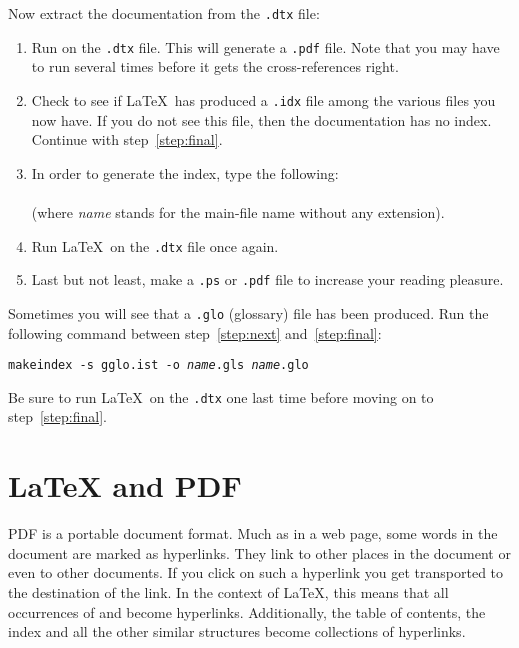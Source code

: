 \noindent Now extract the documentation from the
\texttt{.dtx} file:

\begin{enumerate}
\item Run  on the \texttt{.dtx} file.  This will generate a
  \texttt{.pdf} file. Note that you may have to run 
  several times before it gets the cross-references right.
\item Check to see if \LaTeX\ has produced a \texttt{.idx} file
  among the various files you now have.
  If you do not see this file, then the documentation has no index. Continue
  with step~\ref{step:final}.
\item In order to generate the index, type the following:\\
        \\
        (where \textit{name} stands for the main-file name without any
    extension).
 \item Run \LaTeX\ on the \texttt{.dtx} file once again. \label{step:next}

\item Last but not least, make a \texttt{.ps} or \texttt{.pdf}
  file to increase your reading pleasure.\label{step:final}

\end{enumerate}

Sometimes you will see that a \texttt{.glo}
(glossary) file has been produced. Run the following
command between
step~\ref{step:next} and~\ref{step:final}:

\noindent\texttt{makeindex -s gglo.ist -o \textit{name}.gls \textit{name}.glo}

\noindent Be sure to run \LaTeX\ on the \texttt{.dtx} one last
time before moving on to step~\ref{step:final}.



\section{\LaTeX{} and PDF}\label{sec:pdftex}
%
PDF is a portable  document format. Much as in a web page,
some words in the document are marked as hyperlinks. They link to other
places in the document or even to other documents. If you click
on such a hyperlink you get transported to the destination of the
link. In the context of \LaTeX{}, this means that all occurrences of
 and  become hyperlinks. Additionally, the table
of contents, the index and all the other similar structures become
collections of hyperlinks.

